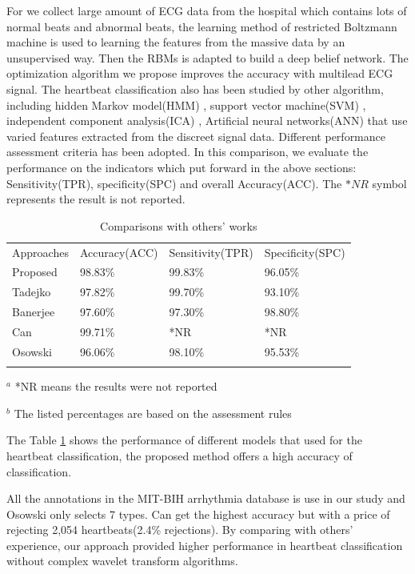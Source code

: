 \documentclass[graybox]{svmult}
\begin{document}
For we collect large amount of ECG data from the hospital which contains lots of normal beats and abnormal beats, the learning method of restricted Boltzmann machine is used to learning the features from the massive data by an unsupervised way. Then the RBMs is adapted to build a deep belief network. The optimization algorithm we propose improves the accuracy with multilead ECG signal. The heartbeat classification also has been studied by other algorithm, including hidden Markov model(HMM) \cite{Andreao}, support vector machine(SVM) \cite{Asl}\cite{Melgani}, independent component analysis(ICA) \cite{Sung}, Artificial neural networks(ANN) that use varied features extracted from the discreet signal data. Different performance assessment criteria has been adopted. In this comparison, we evaluate the performance on the indicators which put forward in the above sections: Sensitivity(TPR), specificity(SPC) and overall Accuracy(ACC). The $*NR$ symbol represents the result is not reported. 

\begin{table}
\caption{Comparisons with others' works}
\label{tab:10}       %
%
%
\begin{tabular}{p{2.9cm}p{2.8cm}p{2.8cm}p{2.8cm}}
\hline\noalign{\smallskip}
Approaches & Accuracy(ACC) & Sensitivity(TPR)  & Specificity(SPC)  \\
\noalign{\smallskip}\svhline\noalign{\smallskip}
Proposed                        & 98.83\%  & 99.83\%    & 96.05\%\\
Tadejko\cite{Tadejko}	   & 97.82\%  & 99.70\%     & 93.10\%  \\
Banerjee\cite{Banerjee} & 97.60\%   & 97.30\%    & 98.80\%    \\
Can\cite{Can}                & 99.71\%   &  *NR          & *NR      \\
Osowski\cite{Osowski}  & 96.06\%   & 98.10\%    & 95.53\%     \\
\noalign{\smallskip}\hline\noalign{\smallskip}
\end{tabular}
$^a$ *NR means the results were not reported

$^b$ The listed percentages are based on the assessment rules
\end{table}


The Table \ref{tab:10} shows the performance of different models that used for the heartbeat classification, the proposed method offers a high accuracy of classification. 

All the annotations in the MIT-BIH arrhythmia database is use in our study and Osowski\cite{Osowski} only selects 7 types. Can\cite{Can} get the highest accuracy but with a price of rejecting 2,054 heartbeats(2.4\% rejections). By comparing with others' experience, our approach provided higher performance in heartbeat classification without complex wavelet transform algorithms. 
\end{document}
